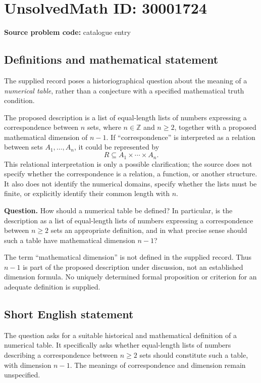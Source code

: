\documentclass[11pt]{article}
\newcommand{\Z}{\mathbb{Z}}
\begin{document}
\section*{UnsolvedMath ID: 30001724}
\textbf{Source problem code:} catalogue entry
\subsection{Definitions and mathematical statement}
The supplied record poses a historiographical question about the meaning of a \emph{numerical table}, rather than a conjecture with a specified mathematical truth condition.

The proposed description is a list of equal-length lists of numbers expressing a correspondence between \(n\) sets, where \(n\in\Z\) and \(n\geq 2\), together with a proposed mathematical dimension of \(n-1\). If ``correspondence'' is interpreted as a relation between sets \(A_1,\ldots,A_n\), it could be represented by
\[
R\subseteq A_1\times\cdots\times A_n.
\]
This relational interpretation is only a possible clarification; the source does not specify whether the correspondence is a relation, a function, or another structure. It also does not identify the numerical domains, specify whether the lists must be finite, or explicitly identify their common length with \(n\).

\textbf{Question.} How should a numerical table be defined? In particular, is the description as a list of equal-length lists of numbers expressing a correspondence between \(n\geq 2\) sets an appropriate definition, and in what precise sense should such a table have mathematical dimension \(n-1\)?

The term ``mathematical dimension'' is not defined in the supplied record. Thus \(n-1\) is part of the proposed description under discussion, not an established dimension formula. No uniquely determined formal proposition or criterion for an adequate definition is supplied.
\subsection{Short English statement}
The question asks for a suitable historical and mathematical definition of a numerical table. It specifically asks whether equal-length lists of numbers describing a correspondence between \(n\geq 2\) sets should constitute such a table, with dimension \(n-1\). The meanings of correspondence and dimension remain unspecified.
\end{document}
